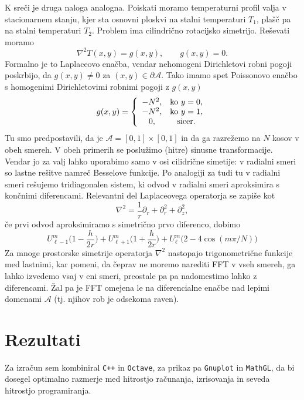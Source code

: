 \documentclass[a4 paper, 12pt]{article}
\begin{document}
K sre\v ci je druga naloga analogna. Poiskati moramo temperaturni profil valja v stacionarnem stanju,
kjer sta osnovni ploskvi na stalni temperaturi $T_1$, pla\v s\v c pa na stalni temperaturi $T_2$. Problem
ima cilindri\v cno rotacijsko simetrijo. Re\v sevati moramo
\[
	\nabla^2 T (x,y) = g(x,y), \qquad g(x,y) = 0.
\]
Formalno je to Laplaceovo ena\v cba, vendar nehomogeni Dirichletovi robni pogoji poskrbijo, da
$g(x,y) \neq 0$ za $(x,y) \in \partial \mathcal{A}$. Tako imamo spet Poissonovo ena\v cbo s homogenimi
Dirichletovimi robnimi pogoji z $g (x,y)$
\[
	g(x,y) = \left\{\begin{array}{c c}
			-N^2, & \text{ko\ } y = 0, \\
			-N^2, & \text{ko\ } y = 1, \\
			0, & \text{sicer.}
		\end{array}
		\right.
\]
Tu smo predpostavili, da je $\mathcal{A} = [0,1] \times [0,1]$ in da ga razre\v zemo na $N$ kosov
v obeh smereh. V obeh primerih se poslu\v zimo (hitre) sinusne transformacije. Vendar jo za valj
lahko uporabimo samo v osi cilidri\v cne simetije: v radialni smeri so lastne re\v sitve namre\v c
Besselove funkcije. Po analogiji za tudi tu v radialni smeri re\v sujemo tridiagonalen sistem,
ki odvod v radialni smeri aproksimira s kon\v cnimi diferencami. Relevantni del Laplaceovega
operatorja se zapi\v se kot
\[
    \nabla^2 = \frac{1}{r} \partial_r + \partial_r^2 + \partial_z^2,
\]
\v ce prvi odvod aproksimiramo s simetri\v cno prvo diferenco, dobimo
\[
    U^m_{\ell - 1}\bigg(1 - \frac{h}{2r}\bigg) + U^m_{\ell + 1}\bigg(1 + \frac{h}{2r}\bigg) +
        U^m_\ell \big(2 - 4\cos(m\pi/N)\big)
\]
Za mnoge prostorske simetrije operatorja $\nabla^2$ nastopajo trigonometri\v cne funkcije med
lastnimi, kar pomeni, da \v ceprav ne moremo narediti FFT v vseh smereh, ga lahko izvedemo
vsaj v eni smeri, preostale pa pa nadomestimo lahko z diferencami. \v Zal pa je FFT omejena le
na diferencialne ena\v cbe nad lepimi domenami $\mathcal{A}$ (tj. njihov rob je odsekoma raven).

\section{Rezultati}

Za izra\v cun sem kombiniral {\tt C++} in {\tt Octave}, za prikaz pa {\tt Gnuplot} in {\tt MathGL},
da bi dosegel optimalno razmerje med hitrostjo ra\v cunanja, izrisovanja in seveda hitrostjo programiranja.
\end{document}
